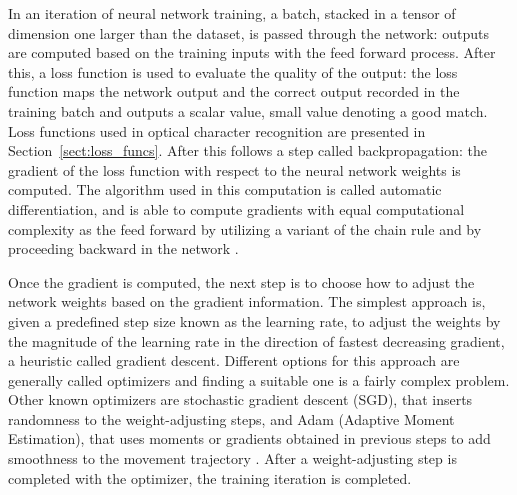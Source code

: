 \documentclass{article}
\begin{document}
In an iteration of neural network training, a batch, stacked in a tensor of dimension one larger than the dataset, 
is passed through the network: outputs are computed based on the training inputs with the feed forward process.
After this, a loss function is used to evaluate the quality of the output: the loss function maps the network output and 
the correct output recorded in the training batch and outputs a scalar value, small value denoting a good 
match. Loss functions used in optical character recognition are presented in Section~\ref{sect:loss_funcs}.
After this follows a step called backpropagation: the gradient of the loss function with respect 
to the neural network weights is computed. The algorithm used in this computation is called automatic differentiation,
and is able to compute gradients with equal computational complexity as the feed forward by utilizing 
a variant of the chain rule and by proceeding backward in the network \cite{princebook}.

Once the gradient is computed, the next step is to choose how to adjust the network weights 
based on the gradient information. The simplest approach is, given a predefined step size 
known as the learning rate, to adjust the weights by the magnitude of the learning rate 
in the direction of fastest decreasing gradient, a heuristic called gradient descent. Different options for this approach 
are generally called optimizers and finding a suitable one is a fairly complex problem.
Other known optimizers are stochastic gradient descent (SGD), that inserts randomness 
to the weight-adjusting steps, and Adam (Adaptive Moment Estimation), that 
uses moments or gradients obtained in previous steps to add smoothness to the 
movement trajectory \cite{princebook}. After a weight-adjusting step is completed 
with the optimizer, the training iteration is completed.
\end{document}

